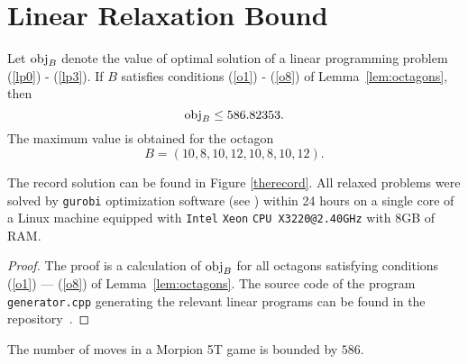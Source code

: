 \section{Linear Relaxation Bound}
\label{linear_bound}

\begin{theorem}
\label{thm:linear_relax}
  Let $\operatorname{obj}_B$ denote the value of optimal solution of a linear programming problem (\ref{lp0}) - (\ref{lp3}).
  If $B$ satisfies conditions (\ref{o1}) - (\ref{o8}) of Lemma~\ref{lem:octagons}, then 
  \[
    \operatorname{obj}_B \leq 586.82353.
  \]
  The maximum value is obtained for the octagon 
  \[
    B = (10, 8, 10, 12, 10, 8, 10, 12).
  \]
\end{theorem}


The record solution can be found in Figure \ref{therecord}. All \theoctagons relaxed problems were solved by {\tt gurobi} optimization software (see \cite{gurobi}) within 24 hours on a single core of a Linux machine equipped with {\tt Intel\textsuperscript{\textregistered}} {\tt Xeon\textsuperscript{\textregistered}} {\tt CPU X3220@2.40GHz} with 8GB of RAM.
\begin{proof}
  The proof is a calculation of $\operatorname{obj}_B$ for all octagons satisfying conditions (\ref{o1}) --- (\ref{o8}) of Lemma~\ref{lem:octagons}. The source code of the program {\tt generator.cpp} generating the relevant linear programs can be found in the repository~\cite{thewebpage}.
\end{proof}


\begin{corollary}
  The number of moves in a Morpion 5T game is bounded by $586$.
\end{corollary}